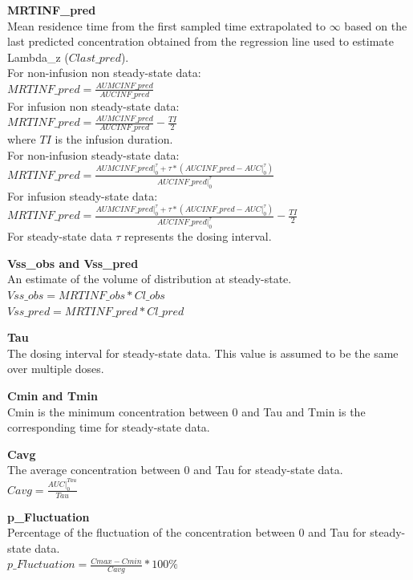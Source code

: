 \documentclass[
  10pt,
]{krantz}
\begin{document}
\textbf{MRTINF\_pred}\\
Mean residence time from the first sampled time extrapolated to \({\infty}\) based on the last predicted concentration obtained from the regression line used to estimate Lambda\_z (\({Clast\_pred}\)).\\
For non-infusion non steady-state data:\\
\(MRTINF\_pred = \frac{AUMCINF\_pred}{AUCINF\_pred}\)\\
For infusion non steady-state data:\\
\(MRTINF\_pred = \frac{AUMCINF\_pred}{AUCINF\_pred}-\frac{TI}{2}\)\\
where \({TI}\) is the infusion duration.\\
For non-infusion steady-state data:\\
\(MRTINF\_pred = \frac{AUMCINF\_pred|_{0}^{\tau}+\tau*(AUCINF\_pred-AUC|_{0}^{\tau})}{AUCINF\_pred|_{0}^{\tau}}\)\\
For infusion steady-state data:\\
\(MRTINF\_pred = \frac{AUMCINF\_pred|_{0}^{\tau}+\tau*(AUCINF\_pred-AUC|_{0}^{\tau})}{AUCINF\_pred|_{0}^{\tau}}-\frac{TI}{2}\)\\
For steady-state data \({\tau}\) represents the dosing interval.

\textbf{Vss\_obs and Vss\_pred}\\
An estimate of the volume of distribution at steady-state.\\
\(Vss\_obs = MRTINF\_obs*Cl\_obs\)\\
\(Vss\_pred = MRTINF\_pred*Cl\_pred\)

\textbf{Tau}\\
The dosing interval for steady-state data. This value is assumed to be the same over multiple doses.

\textbf{Cmin and Tmin}\\
Cmin is the minimum concentration between 0 and Tau and Tmin is the corresponding time for steady-state data.

\textbf{Cavg}\\
The average concentration between 0 and Tau for steady-state data.\\
\(Cavg = \frac{AUC|_{0}^{Tau}}{Tau}\)

\textbf{p\_Fluctuation}\\
Percentage of the fluctuation of the concentration between 0 and Tau for steady-state data.\\
\(p\_Fluctuation = \frac{Cmax-Cmin}{Cavg}*100\%\)
\end{document}
